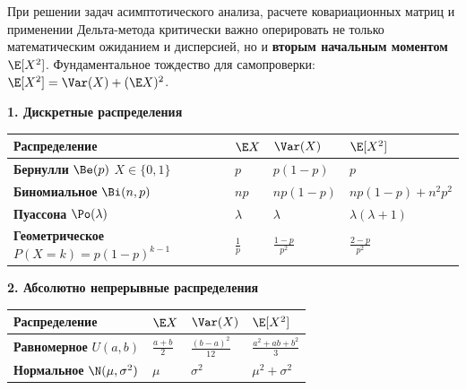 \begin{HackBox}
При решении задач асимптотического анализа, расчете ковариационных матриц и применении Дельта-метода критически важно оперировать не только математическим ожиданием и дисперсией, но и \textbf{вторым начальным моментом} $\E[X^2]$. Фундаментальное тождество для самопроверки: $\E[X^2] = \Var(X) + (\E X)^2$.

\vspace{0.5em}
\textbf{\textsf{1. Дискретные распределения}}
\vspace{0.2em}

\renewcommand{\arraystretch}{1.5}
\begin{tabular}{p{} p{} p{} p{}}
    \textbf{Распределение} & $\E X$ & $\Var(X)$ & $\E[X^2]$ \\
    \hline
    \textbf{Бернулли} $\Be(p)$ \newline $X \in \{0, 1\}$ 
    & $p$ 
    & $p(1-p)$ 
    & $p$ \\

    \textbf{Биномиальное} $\Bi(n, p)$ 
    & $np$ 
    & $np(1-p)$ 
    & $np(1-p) + n^2p^2$ \\

    \textbf{Пуассона} $\Po(\lambda)$ 
    & $\lambda$ 
    & $\lambda$ 
    & $\lambda(\lambda + 1)$ \\

    \textbf{Геометрическое} \newline $P(X=k) = p(1-p)^{k-1}$
    & $\frac{1}{p}$ 
    & $\frac{1-p}{p^2}$ 
    & $\frac{2-p}{p^2}$ \\
\end{tabular}

\vspace{1em}
\textbf{\textsf{2. Абсолютно непрерывные распределения}}
\vspace{0.2em}

\begin{tabular}{p{} p{} p{} p{}}
    \textbf{Распределение} & $\E X$ & $\Var(X)$ & $\E[X^2]$ \\
    \hline
    \textbf{Равномерное} $U(a, b)$ 
    & $\frac{a+b}{2}$ 
    & $\frac{(b-a)^2}{12}$ 
    & $\frac{a^2 + ab + b^2}{3}$ \\

    \textbf{Нормальное} $\N(\mu, \sigma^2)$ 
    & $\mu$ 
    & $\sigma^2$ 
    & $\mu^2 + \sigma^2$ \\


\end{tabular}
\end{HackBox}
